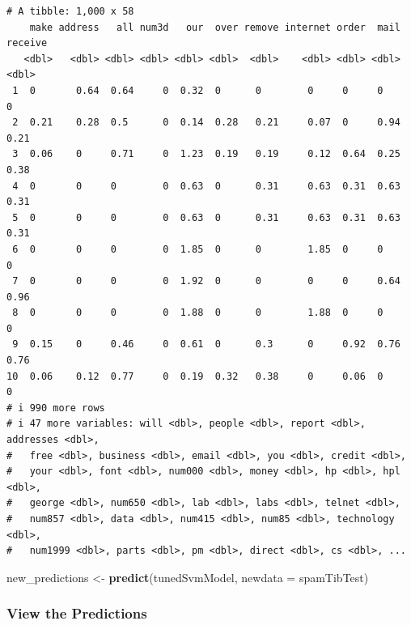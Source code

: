 \documentclass[
]{article}
\newenvironment{Shaded}{\begin{snugshade}}{\end{snugshade}}
\newcommand{\AttributeTok}[1]{\textcolor[rgb]{0.13,0.29,0.53}{#1}}
\newcommand{\FunctionTok}[1]{\textcolor[rgb]{0.13,0.29,0.53}{\textbf{#1}}}
\newcommand{\NormalTok}[1]{#1}
\newcommand{\OtherTok}[1]{\textcolor[rgb]{0.56,0.35,0.01}{#1}}
\newcommand{\SpecialCharTok}[1]{\textcolor[rgb]{0.81,0.36,0.00}{\textbf{#1}}}
\begin{document}
\begin{verbatim}
# A tibble: 1,000 x 58
    make address   all num3d   our  over remove internet order  mail receive
   <dbl>   <dbl> <dbl> <dbl> <dbl> <dbl>  <dbl>    <dbl> <dbl> <dbl>   <dbl>
 1  0       0.64  0.64     0  0.32  0      0        0     0     0       0   
 2  0.21    0.28  0.5      0  0.14  0.28   0.21     0.07  0     0.94    0.21
 3  0.06    0     0.71     0  1.23  0.19   0.19     0.12  0.64  0.25    0.38
 4  0       0     0        0  0.63  0      0.31     0.63  0.31  0.63    0.31
 5  0       0     0        0  0.63  0      0.31     0.63  0.31  0.63    0.31
 6  0       0     0        0  1.85  0      0        1.85  0     0       0   
 7  0       0     0        0  1.92  0      0        0     0     0.64    0.96
 8  0       0     0        0  1.88  0      0        1.88  0     0       0   
 9  0.15    0     0.46     0  0.61  0      0.3      0     0.92  0.76    0.76
10  0.06    0.12  0.77     0  0.19  0.32   0.38     0     0.06  0       0   
# i 990 more rows
# i 47 more variables: will <dbl>, people <dbl>, report <dbl>, addresses <dbl>,
#   free <dbl>, business <dbl>, email <dbl>, you <dbl>, credit <dbl>,
#   your <dbl>, font <dbl>, num000 <dbl>, money <dbl>, hp <dbl>, hpl <dbl>,
#   george <dbl>, num650 <dbl>, lab <dbl>, labs <dbl>, telnet <dbl>,
#   num857 <dbl>, data <dbl>, num415 <dbl>, num85 <dbl>, technology <dbl>,
#   num1999 <dbl>, parts <dbl>, pm <dbl>, direct <dbl>, cs <dbl>, ...
\end{verbatim}

\begin{Shaded}
\begin{Highlighting}[]
\NormalTok{new\_predictions }\OtherTok{\textless{}{-}} \FunctionTok{predict}\NormalTok{(tunedSvmModel, }\AttributeTok{newdata =}\NormalTok{ spamTibTest)}
\end{Highlighting}
\end{Shaded}

\subsubsection{View the Predictions}\label{view-the-predictions}

\begin{Shaded}
\end{Shaded}
\end{document}
